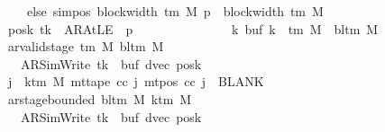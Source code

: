 \begin{isabellebody}
\ \ \ \ \ \ \ \ \ \ \ \ \ \ \ \ else\ sim{\isacharunderscore}{\kern0pt}pos\ {\isacharparenleft}{\kern0pt}block{\isacharunderscore}{\kern0pt}width\ {\isacharparenleft}{\kern0pt}{\isasymGamma}{\isacharunderscore}{\kern0pt}tm\ M{\isacharparenright}{\kern0pt}{\isacharparenright}{\kern0pt}\ p{\isacharprime}{\kern0pt}\ {\isacharplus}{\kern0pt}\ block{\isacharunderscore}{\kern0pt}width\ {\isacharparenleft}{\kern0pt}{\isasymGamma}{\isacharunderscore}{\kern0pt}tm\ M{\isacharparenright}{\kern0pt}{\isacharparenright}{\kern0pt}{\isacharsemicolon}{\kern0pt}\isanewline
\ \ \ \ \ \ \ \ \ \ \ \ \ posk\ tk{\isacharprime}{\kern0pt}\ {\isacharequal}{\kern0pt}\ AR{\isacharunderscore}{\kern0pt}AtLE\ {\isasymlongleftrightarrow}\ p{\isacharprime}{\kern0pt}\ {\isacharequal}{\kern0pt}\ {}{\isacharsemicolon}{\kern0pt}\isanewline
\ \ \ \ \ \ \ \ \ \ \ \ \ {\isasymforall}k{\isachardot}{\kern0pt}\ buf\ k\ {\isasymin}\ {\isasymGamma}{\isacharunderscore}{\kern0pt}tm\ M\ {\isasymunion}\ {\isacharbraceleft}{\kern0pt}bl{\isacharunderscore}{\kern0pt}tm\ M{\isacharbraceright}{\kern0pt}{\isacharsemicolon}{\kern0pt}\isanewline
\ \ \ \ \ \ \ \ \ \ \ \ \ ar{\isacharunderscore}{\kern0pt}valid{\isacharunderscore}{\kern0pt}stage\ {\isacharparenleft}{\kern0pt}{\isasymGamma}{\isacharunderscore}{\kern0pt}tm\ M{\isacharparenright}{\kern0pt}\ {\isacharparenleft}{\kern0pt}bl{\isacharunderscore}{\kern0pt}tm\ M{\isacharparenright}{\kern0pt}\isanewline
\ \ \ \ \ \ \ \ \ \ \ \ \ \ \ {\isacharparenleft}{\kern0pt}AR{\isacharunderscore}{\kern0pt}SimWrite{\isacharcomma}{\kern0pt}\ tk{\isacharprime}{\kern0pt}{\isacharcomma}{\kern0pt}\ {}{\isacharcomma}{\kern0pt}\ buf{\isacharcomma}{\kern0pt}\ dvec{\isacharcomma}{\kern0pt}\ posk{\isacharparenright}{\kern0pt}{\isacharsemicolon}{\kern0pt}\isanewline
\ \ \ \ \ \ \ \ \ \ \ \ \ {\isasymforall}j\ {\isasymge}\ k{\isacharunderscore}{\kern0pt}tm\ M{\isachardot}{\kern0pt}\ mt{\isacharunderscore}{\kern0pt}tape\ cc\ j\ {\isacharparenleft}{\kern0pt}mt{\isacharunderscore}{\kern0pt}pos\ cc\ j{\isacharparenright}{\kern0pt}\ {\isacharequal}{\kern0pt}\ BLANK{}{\isacharsemicolon}{\kern0pt}\isanewline
\ \ \ \ \ \ \ \ \ \ \ \ \ ar{\isacharunderscore}{\kern0pt}stage{\isacharunderscore}{\kern0pt}bounded\ {\isacharparenleft}{\kern0pt}bl{\isacharunderscore}{\kern0pt}tm\ M{\isacharparenright}{\kern0pt}\ {\isacharparenleft}{\kern0pt}k{\isacharunderscore}{\kern0pt}tm\ M{\isacharparenright}{\kern0pt}\isanewline
\ \ \ \ \ \ \ \ \ \ \ \ \ \ \ {\isacharparenleft}{\kern0pt}AR{\isacharunderscore}{\kern0pt}SimWrite{\isacharcomma}{\kern0pt}\ tk{\isacharprime}{\kern0pt}{\isacharcomma}{\kern0pt}\ {}{\isacharcomma}{\kern0pt}\ buf{\isacharcomma}{\kern0pt}\ dvec{\isacharcomma}{\kern0pt}\ posk{\isacharparenright}{\kern0pt}\ {\isasymrbrakk}\isanewline

\end{isabellebody}

